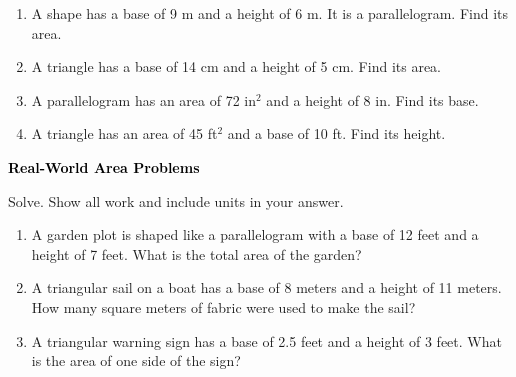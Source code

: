 \documentclass[12pt, letterpaper, fleqn]{article}
\begin{document}
\begin{enumerate}[itemsep=2.3cm, leftmargin=0.6cm]

\item A shape has a base of 9 m and a height of 6 m. It is a parallelogram. Find its area.

\vspace{2cm}

\item A triangle has a base of 14 cm and a height of 5 cm. Find its area.

\vspace{2cm}

\item A parallelogram has an area of 72 in$^2$ and a height of 8 in. Find its base.

\vspace{2cm}

\item A triangle has an area of 45 ft$^2$ and a base of 10 ft. Find its height.

\vspace{2cm}

\end{enumerate}

\newpage

\begin{tcolorbox}[colback=black!10]
\large\textcolor{black}{\textbf{Real-World Area Problems}}
\end{tcolorbox}

\noindent
Solve. Show all work and include units in your answer.

\vspace{3mm}

\begin{enumerate}[itemsep=2.5cm, leftmargin=0.6cm]

\item A garden plot is shaped like a parallelogram with a base of 12 feet and a height of 7 feet. What is the total area of the garden?

\vspace{2.3cm}

\item A triangular sail on a boat has a base of 8 meters and a height of 11 meters. How many square meters of fabric were used to make the sail?

\vspace{2.3cm}

\item A triangular warning sign has a base of 2.5 feet and a height of 3 feet. What is the area of one side of the sign?

\vspace{2.5cm}

\end{enumerate}
\end{document}
